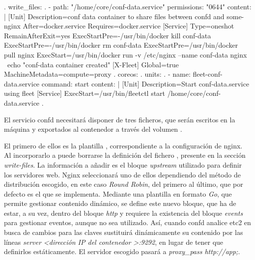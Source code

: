 \begin{codelisting}
\label{code:conf-data}
\begin{code}
.
write_files:
.
  - path: "/home/core/conf-data.service"
    permissions: "0644"
    content: |
      [Unit] 
      Description=conf data container to share files between confd and some-nginx
      After=docker.service
      Requires=docker.service
      [Service] 
      Type=oneshot
      RemainAfterExit=yes
      ExecStartPre=-/usr/bin/docker kill conf-data 
      ExecStartPre=-/usr/bin/docker rm conf-data
      ExecStartPre=/usr/bin/docker pull nginx 
      ExecStart=/usr/bin/docker run -v /etc/nginx --name conf-data nginx \
      echo "conf-data container created" 
      [X-Fleet]
      Global=true
      MachineMetadata=compute=proxy
  .
coreos:
  .
  units:
  .
  - name: fleet-conf-data.service
    command: start
    content: |
      [Unit]
      Description=Start conf-data.service using fleet
      [Service]
      ExecStart=/usr/bin/fleetctl start /home/core/conf-data.service
  .
\end{code}
\end{codelisting}

El servicio confd necesitará disponer de tres ficheros, que serán escritos en la máquina y exportados al contenedor a través del volumen .

El primero de ellos es la plantilla , correspondiente a la configuración de nginx. Al incorporarlo a  puede borrarse la definición del fichero , presente en la sección \textit{write-files}. La información a añadir es el bloque \textit{upstream} utilizado para definir los servidores web. Nginx seleccionará uno de ellos dependiendo del método de distribución escogido, en este caso \textit{Round Robin}, del primero al último, que por defecto es el que se implementa. Mediante una plantilla en formato \textit{Go}, que permite gestionar contenido dinámico, se define este nuevo bloque, que ha de estar, a su vez, dentro del bloque \textit{http} y requiere la existencia del bloque \textit{events} para gestionar eventos, aunque no sea utilizado. Así, cuando confd analice etc2 en busca de cambios para las claves  sustituirá dinámicamente su contenido por las líneas \textit{server <dirección IP del contenedor >:9292}, en lugar de tener que definirlos estáticamente. El servidor escogido pasará a \textit{proxy\_pass http://app;}.

